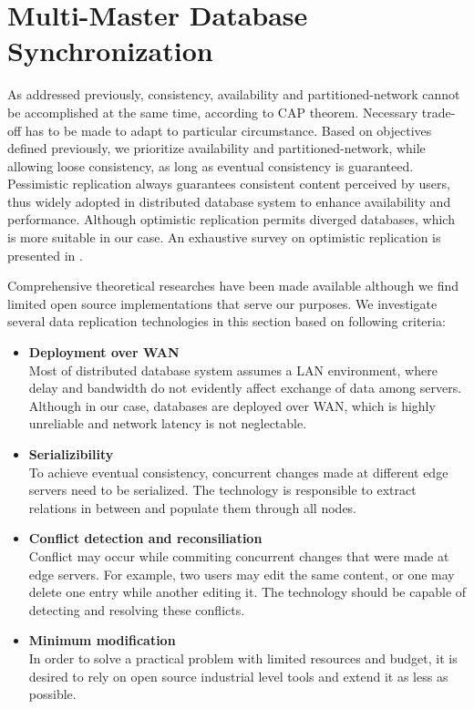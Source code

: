 
\section{Multi-Master Database Synchronization} \label{database_sync}
As addressed previously, consistency, availability and partitioned-network cannot be accomplished at the same time, according to CAP theorem\cite{brewer2000towards}. Necessary trade-off has to be made to adapt to particular circumstance. Based on objectives defined previously, we prioritize availability and partitioned-network, while allowing loose consistency, as long as eventual consistency is guaranteed\cite{vogels2009eventually}. Pessimistic replication always guarantees consistent content perceived by users, thus widely adopted in distributed database system to enhance availability and performance. Although optimistic replication permits diverged databases, which is more suitable in our case. An exhaustive survey on optimistic replication is presented in \cite{saito2005optimistic}.

Comprehensive theoretical researches have been made available although we find limited open source implementations that serve our purposes. We investigate several data replication technologies in this section based on following criteria:
\begin{itemize}
\item \textbf{Deployment over WAN}\\
Most of distributed database system assumes a LAN environment, where delay and bandwidth do not evidently affect exchange of data among servers. Although in our case, databases are deployed over WAN, which is highly unreliable and network latency is not neglectable.

\item \textbf{Serializibility}\\
To achieve eventual consistency, concurrent changes made at different edge servers need to be serialized. The technology is responsible to extract relations in between and populate them through all nodes.

\item \textbf{Conflict detection and reconsiliation}\\
Conflict may occur while commiting concurrent changes that were made at edge servers. For example, two users may edit the same content, or one may delete one entry while another editing it. The technology should be capable of detecting and resolving these conflicts.

\item \textbf{Minimum modification}\\
In order to solve a practical problem with limited resources and budget, it is desired to rely on open source industrial level tools and extend it as less as possible. 
\end{itemize}

